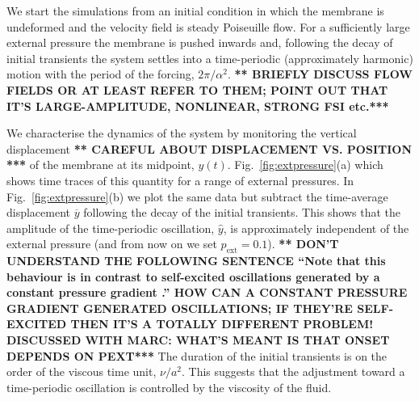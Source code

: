 \documentclass[aps,prl,reprint,superscriptaddress,floatfix]{revtex4-1}
\begin{document}

We start the simulations from an initial condition in
which the membrane is undeformed and the velocity
field is steady Poiseuille flow. For a sufficiently large external
pressure the membrane is pushed inwards and, following 
the decay of initial transients the system settles into a
time-periodic (approximately harmonic) motion with the period of the
forcing, $2\pi/\alpha^2$. {\bf *** BRIEFLY DISCUSS FLOW FIELDS OR
  AT LEAST REFER TO THEM; POINT OUT THAT IT'S LARGE-AMPLITUDE,
  NONLINEAR, STRONG FSI etc.***}

We characterise the dynamics of the system by monitoring the vertical
displacement {\bf *** CAREFUL ABOUT DISPLACEMENT VS. POSITION ***}
of the membrane at its midpoint, $y(t)$.
Fig.~\ref{fig:extpressure}(a) which shows time traces of this quantity
for a range of external pressures. In Fig.~\ref{fig:extpressure}(b) we plot
the same data but subtract the time-average displacement
$\overline{y}$ following the decay of the initial transients. This shows
that the amplitude of the time-periodic oscillation, $\widehat{y}$,
is approximately independent of the external pressure (and from now on we set
$p_\text{ext}=0.1$).
{\bf *** DON'T UNDERSTAND THE FOLLOWING SENTENCE ``Note that this
behaviour is in contrast to self-excited oscillations generated by a
constant pressure gradient \cite{Tang15}.'' HOW CAN A CONSTANT
PRESSURE
GRADIENT GENERATED OSCILLATIONS; IF THEY'RE SELF-EXCITED THEN IT'S
A TOTALLY DIFFERENT PROBLEM! DISCUSSED WITH MARC: WHAT'S MEANT IS THAT
ONSET DEPENDS ON PEXT***}
The duration of the initial transients is on the order of the
viscous time unit, $\nu/a^2$. This suggests
that the adjustment toward a time-periodic oscillation is 
controlled by the viscosity of the fluid.
\end{document}
